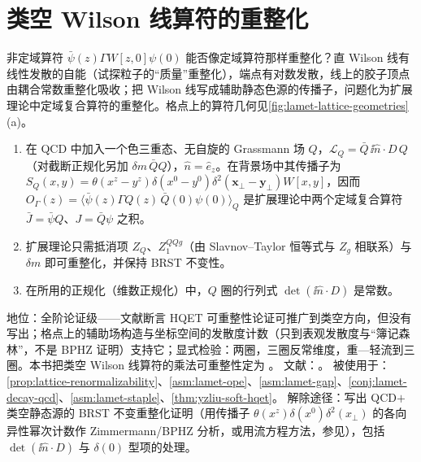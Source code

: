 \section{类空 Wilson 线算符的重整化}\label{sec:lamet-renorm}

非定域算符 $\bar\psi(z)\Gamma W[z,0]\psi(0)$ 能否像定域算符那样重整化？直 Wilson 线有线性发散的自能（试探粒子的“质量”重整化），端点有对数发散，线上的胶子顶点由耦合常数重整化吸收\cite{Polyakov1980,Dotsenko:1979wb,BrandtNeriSato1981,Craigie:1980qs}；把 Wilson 线写成辅助静态色源的传播子，问题化为扩展理论中定域复合算符的重整化\cite{Dorn:1986dt}。格点上的算符几何见\cref{fig:lamet-lattice-geometries}(a)。


\begin{assumption}\label{asm:lamet-aux-renorm}
\begin{enumerate}[label=(AX\arabic*),leftmargin=3.2em,itemsep=1pt,topsep=2pt]
\item 在 QCD 中加入一个色三重态、无自旋的 Grassmann 场 $Q$，$\mathcal L_Q=\bar Q\,\ii\hat n\cdot D\,Q$（对截断正规化另加 $\delta m\,\bar QQ$），$\hat n=\hat e_z$。在背景场中其传播子为 $S_Q(x,y)=\theta(x^z-y^z)\delta(x^0-y^0)\delta^2(\mathbf x_\perp-\mathbf y_\perp)W[x,y]$，因而 $O_\Gamma(z)=\langle\bar\psi(z)\Gamma Q(z)\,\bar Q(0)\psi(0)\rangle_Q$ 是扩展理论中两个定域复合算符 $\bar J=\bar\psi Q$、$J=\bar Q\psi$ 之积。
\item 扩展理论只需抵消项 $Z_Q$、$Z_1^{QQg}$（由 Slavnov--Taylor 恒等式与 $Z_g$ 相联系）与 $\delta m$ 即可重整化，并保持 BRST 不变性。
\item 在所用的正规化（维数正规化）中，$Q$ 圈的行列式 $\det(\ii\hat n\cdot D)$ 是常数。
\end{enumerate}
地位：全阶论证级——文献\cite{Ji:2017oey}断言 HQET 可重整性论证可推广到类空方向，但没有写出；格点上的辅助场构造\cite{Green:2017xeu}与坐标空间的发散度计数\cite{Ishikawa:2017faj}（只到表观发散度与“簿记森林”，不是 BPHZ 证明）支持它；显式检验：两圈\cite{Ji:2015jwa}，三圈反常维度\cite{Braun:2020ymy}，重—轻流到三圈\cite{Chetyrkin:2003vi}。本书把类空 Wilson 线算符的乘法可重整性定为 \tagA。
文献：\cite{Ji:2017oey,Green:2017xeu,Ishikawa:2017faj,Dorn:1986dt,Dotsenko:1979wb,Braun:2020ymy,Chetyrkin:2003vi}。
被使用于：\cref{prop:lattice-renormalizability}、\cref{asm:lamet-ope}、\cref{asm:lamet-gap}、\cref{conj:lamet-decay-qcd}、\cref{asm:lamet-staple}、\cref{thm:yzliu-soft-hqet}。
解除途径：写出 QCD$+$类空静态源的 BRST 不变重整化证明（用传播子 $\theta(x^z)\delta(x^0)\delta^2(x_\perp)$ 的各向异性幂次计数作 Zimmermann/BPHZ 分析，或用流方程方法，参见\cite{Frob:2015uqy}），包括 $\det(\ii\hat n\cdot D)$ 与 $\delta(0)$ 型项的处理。
\end{assumption}


